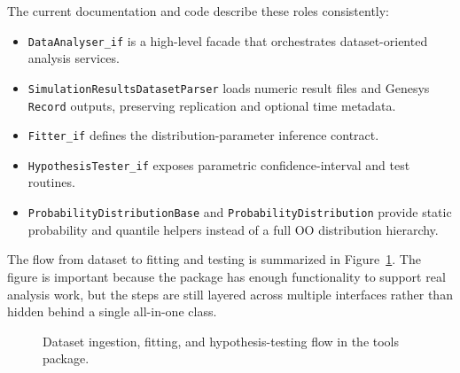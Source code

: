 The current documentation and code describe these roles consistently:
\begin{itemize}
\item \texttt{DataAnalyser\_if} is a high-level facade that orchestrates dataset-oriented analysis services.
\item \texttt{SimulationResultsDatasetParser} loads numeric result files and Genesys \texttt{Record} outputs, preserving replication and optional time metadata.
\item \texttt{Fitter\_if} defines the distribution-parameter inference contract.
\item \texttt{HypothesisTester\_if} exposes parametric confidence-interval and test routines.
\item \texttt{ProbabilityDistributionBase} and \texttt{ProbabilityDistribution} provide static probability and quantile helpers instead of a full OO distribution hierarchy.
\end{itemize}

The flow from dataset to fitting and testing is summarized in Figure~\ref{fig:tools-fit-test-flow}. The figure is important because the package has enough functionality to support real analysis work, but the steps are still layered across multiple interfaces rather than hidden behind a single all-in-one class.

\begin{figure}[htbp]
\centering
{}
\caption{Dataset ingestion, fitting, and hypothesis-testing flow in the tools package.}
\label{fig:tools-fit-test-flow}
\end{figure}


